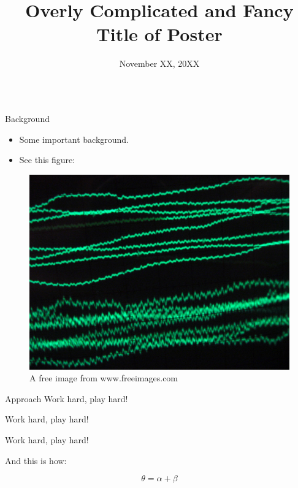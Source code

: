 \documentclass{beamer}
\title{Overly Complicated and Fancy \\ Title of Poster}
\date{November XX, 20XX}
\newlength{\onecolwid}
\begin{document}
\begin{frame}
\begin{columns}[t]

\begin{column}{\onecolwid}

  \begin{block}{Background}
    \begin{itemize}
      \item \alert{Some important} background.
      \item See this figure:
    \end{itemize}
    \begin{figure}
      \centering
      \includegraphics[width=0.60\linewidth]{sample}
      \caption{A free image from www.freeimages.com}
      \label{fig:sample}
    \end{figure}
  \end{block}

  \begin{block}{Approach}
    Work hard, play hard!

    Work hard, play hard!

    Work hard, play hard!

    And this is how:

    \begin{equation*}
      \theta = \alpha + \beta
      \label{eqn:equation}
    \end{equation*}
  \end{block}
\end{column}


\end{columns}
\end{frame}
\end{document}

